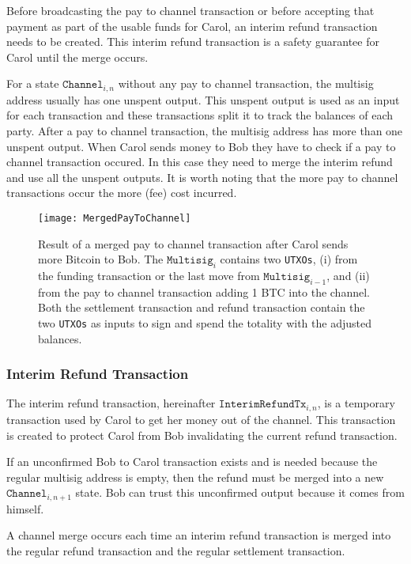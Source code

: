 \documentclass{llncs}
\begin{document}
Before broadcasting the pay to channel transaction or before accepting that
payment as part of the usable funds for Carol, an interim refund transaction
needs to be created. This interim refund transaction is a safety guarantee for
Carol until the merge occurs.

For a state $\texttt{Channel}_{i,n}$ without any pay to channel transaction, the
multisig address usually has one unspent output. This unspent output is used as
an input for each transaction and these transactions split it to track the
balances of each party. After a pay to channel transaction, the multisig address
has more than one unspent output. When Carol sends money to Bob they have to
check if a pay to channel transaction occured. In this case they need to merge
the interim refund and use all the unspent outputs. It is worth noting that the
more pay to channel transactions occur the more (fee) cost incurred.

\begin{figure} \centering
\texttt{[image: MergedPayToChannel]}
  \caption{Result of a merged pay to channel transaction after Carol sends more
Bitcoin to Bob. The $\texttt{Multisig}_{i}$ contains two \texttt{UTXOs}, (i)
from the funding transaction or the last move from $\texttt{Multisig}_{i-1}$,
and (ii) from the pay to channel transaction adding 1 BTC into the channel. Both
the settlement transaction and refund transaction contain the two \texttt{UTXOs}
as inputs to sign and spend the totality with the adjusted balances.}
\end{figure}

\subsubsection{Interim Refund Transaction} The interim refund transaction,
hereinafter $\texttt{InterimRefundTx}_{i,n}$, is a temporary transaction used by
Carol to get her money out of the channel. This transaction is created to
protect Carol from Bob invalidating the current refund transaction.

If an unconfirmed Bob to Carol transaction exists and is needed because the
regular multisig address is empty, then the refund must be merged into a new
$\texttt{Channel}_{i,n+1}$ state. Bob can trust this unconfirmed output because
it comes from himself.

\begin{definition} A channel merge occurs each time an interim
refund transaction is merged into the regular refund transaction and the regular
settlement transaction.
\end{definition}
\end{document}
